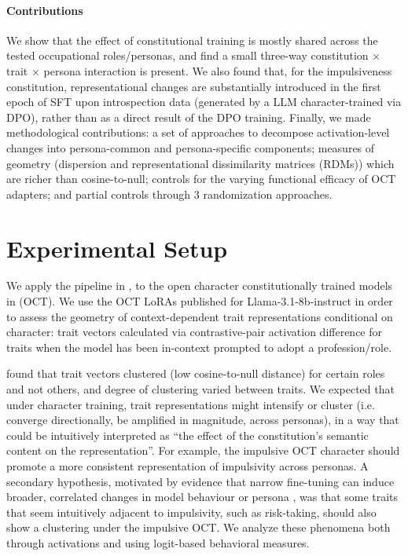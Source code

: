 \documentclass{article}
\begin{document}
\paragraph{Contributions}
We show that the effect of constitutional training is mostly shared across the tested occupational roles/personas, and find a small three-way constitution $\times$ trait $\times$ persona interaction is present. We also found that, for the impulsiveness constitution, representational changes are substantially introduced in the first epoch of SFT upon introspection data (generated by a LLM character-trained via DPO), rather than as a direct result of the DPO training. Finally, we made methodological contributions: a set of approaches to decompose activation-level changes into persona-common and persona-specific components; measures of geometry (dispersion and representational dissimilarity matrices (RDMs)) which are richer than cosine-to-null; controls for the varying functional efficacy of OCT adapters; and partial controls through 3 randomization approaches. 

\section{Experimental Setup}
We apply the pipeline in \citet{anonymous2026personas}, to the open character constitutionally trained models in \citet{maiya2025opencharactertrainingshaping} (OCT). We use the OCT LoRAs published for Llama-3.1-8b-instruct in order to assess the geometry of context-dependent trait representations conditional on character: trait vectors calculated via contrastive-pair activation difference \citep{rimsky2024steering} for traits when the model has been in-context prompted to adopt a profession/role.  

\citet{anonymous2026personas} found that trait vectors clustered (low cosine-to-null distance) for certain roles and not others, and degree of clustering varied between traits. We expected that under character training, trait representations might intensify or cluster (i.e. converge directionally, be amplified in magnitude, across personas), in a way that could be intuitively interpreted as “the effect of the constitution's semantic content on the representation”. For example, the impulsive OCT character should promote a more consistent representation of impulsivity across personas. A secondary hypothesis, motivated by evidence that narrow fine-tuning can induce broader, correlated changes in model behaviour or persona \citep{Betley2026BroadMisalignment,chen2025persona}, was that some traits that seem intuitively adjacent to impulsivity, such as risk-taking, should also show a clustering under the impulsive OCT. We analyze these phenomena both through activations and using logit-based behavioral measures.
\end{document}
